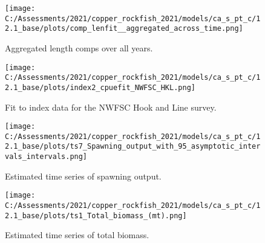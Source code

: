 \documentclass[11pt,
  english,
  a4paper,
]{article}
\begin{document}
\tagmcend\tagstructend


\begin{figure}
\centering
\texttt{[image: C:/Assessments/2021/copper\_rockfish\_2021/models/ca\_s\_pt\_c/12.1\_base/plots/comp\_lenfit\_\_aggregated\_across\_time.png]}
\caption{Aggregated length comps over all years.\label{fig:agg-len-fit}}
\end{figure}

\tagmcend\tagstructend


\begin{figure}
\centering
\texttt{[image: C:/Assessments/2021/copper\_rockfish\_2021/models/ca\_s\_pt\_c/12.1\_base/plots/index2\_cpuefit\_NWFSC\_HKL.png]}
\caption{Fit to index data for the NWFSC Hook and Line survey.\label{fig:index-fit}}
\end{figure}

\tagmcend\tagstructend


\begin{figure}
\centering
\texttt{[image: C:/Assessments/2021/copper\_rockfish\_2021/models/ca\_s\_pt\_c/12.1\_base/plots/ts7\_Spawning\_output\_with\_95\_asymptotic\_intervals\_intervals.png]}
\caption{Estimated time series of spawning output.\label{fig:ssb}}
\end{figure}

\tagmcend\tagstructend


\begin{figure}
\centering
\texttt{[image: C:/Assessments/2021/copper\_rockfish\_2021/models/ca\_s\_pt\_c/12.1\_base/plots/ts1\_Total\_biomass\_(mt).png]}
\caption{Estimated time series of total biomass.\label{fig:tot-bio}}
\end{figure}

\tagmcend\tagstructend

\end{document}
